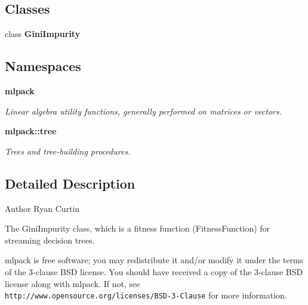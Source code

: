 \subsection*{Classes}
\begin{DoxyCompactItemize}
\item 
class \textbf{ Gini\+Impurity}
\end{DoxyCompactItemize}
\subsection*{Namespaces}
\begin{DoxyCompactItemize}
\item 
 \textbf{ mlpack}
\begin{DoxyCompactList}\small\item\em Linear algebra utility functions, generally performed on matrices or vectors. \end{DoxyCompactList}\item 
 \textbf{ mlpack\+::tree}
\begin{DoxyCompactList}\small\item\em Trees and tree-\/building procedures. \end{DoxyCompactList}\end{DoxyCompactItemize}


\subsection{Detailed Description}
\begin{DoxyAuthor}{Author}
Ryan Curtin
\end{DoxyAuthor}
The Gini\+Impurity class, which is a fitness function (Fitness\+Function) for streaming decision trees.

mlpack is free software; you may redistribute it and/or modify it under the terms of the 3-\/clause B\+SD license. You should have received a copy of the 3-\/clause B\+SD license along with mlpack. If not, see {\tt http\+://www.\+opensource.\+org/licenses/\+B\+S\+D-\/3-\/\+Clause} for more information. 